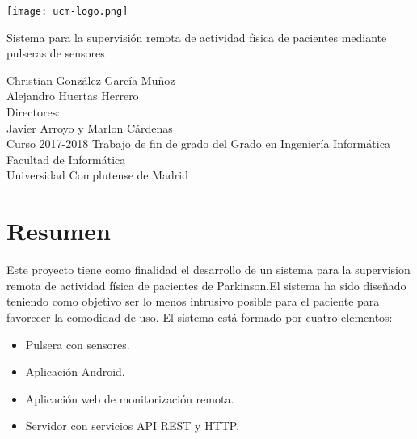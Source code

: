 \documentclass[11pt,spanish]{article}
\author{
\Large Christian González García-Muñoz \\ 
\Large Alejandro Huertas Herrero 
}
\date{}
\begin{document}
\begin{titlepage}
	\centering
    \texttt{[image: ucm-logo.png]}
    \vskip 1cm
    
    \centering
    {\huge Sistema para la supervisión remota de actividad física de pacientes mediante pulseras de sensores 
    }
    \newline
    \newline
    \newline
    \newline
    
	\centering \large { Christian González García-Muñoz \\  Alejandro Huertas Herrero \\ 
    					\bigskip Directores: \\ Javier Arroyo y Marlon Cárdenas \\ \bigskip}
    \vskip 1cm
    \centering \Large {Curso 2017-2018}
    \vskip 1cm
    \centering \Large { Trabajo de fin de grado del Grado en Ingeniería Informática }
	\vskip 1cm
    \centering \large {Facultad de Informática \\ Universidad Complutense de Madrid}
    \vskip 0.5cm

\end{titlepage}
\clearpage
\vphantom{a}
\newpage


\section*{Resumen}

Este proyecto tiene como finalidad el desarrollo de un sistema para la supervision remota de actividad física de pacientes de Parkinson.El sistema ha sido diseñado teniendo como objetivo ser lo menos intrusivo posible para el paciente para favorecer la comodidad de uso. El sistema está formado por cuatro elementos:

\begin{itemize}
    \item Pulsera con sensores. 
	\item Aplicación Android. 
	\item Aplicación web de monitorización remota.
    \item Servidor con servicios API REST y HTTP.
    \newline
\end{itemize}
\end{document}
